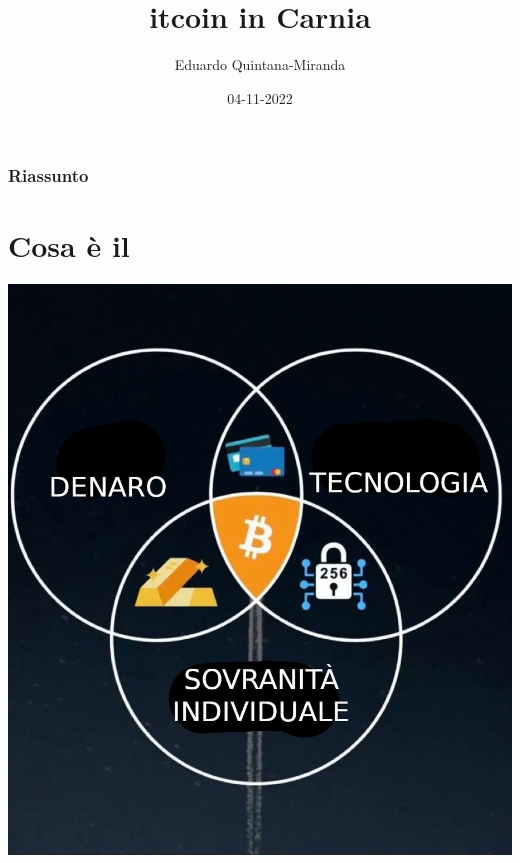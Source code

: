 \documentclass{beamer}
\title{\bitcoinA itcoin in Carnia}
\author{Eduardo Quintana-Miranda}
\date{04-11-2022}
\begin{document}
\frame{\titlepage}

\begin{frame}
    \frametitle{Riassunto}
    \tableofcontents
\end{frame}

\section{Cosa \`e il \Bitcoin}
\begin{frame}{\insertsection}
    \centering

    \includegraphics[height=.8\textheight]{images/money-technology-freedom-it.jpeg}
\end{frame}
\end{document}
